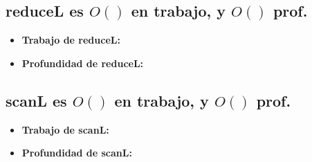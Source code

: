 \documentclass[12pt]{article}
\begin{document}
\subsection{reduceL es $O()$ en trabajo, y $O()$ prof.}

\begin{itemize}

\item \textbf{Trabajo de reduceL:}


\item \textbf{Profundidad de reduceL:}
    
\end{itemize}


\subsection{scanL es $O()$ en trabajo, y $O()$ prof.}

\begin{itemize}

\item \textbf{Trabajo de scanL:}


\item \textbf{Profundidad de scanL:}
    
\end{itemize}    
\end{document}
